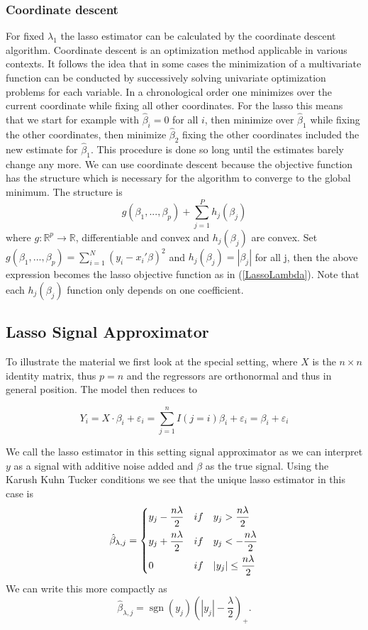 \documentclass{article}
\theoremstyle{definition}
\DeclareMathOperator*{\sgn}{sgn}
\begin{document}
\subsubsection{Coordinate descent} \label{Sec: Coordinate Lasso}
For fixed $\lambda_1$ the lasso estimator can be calculated by the coordinate descent algorithm.
Coordinate descent is an optimization method applicable in various contexts. It follows the idea that in some cases the minimization of a multivariate function can be conducted by successively solving univariate optimization problems for each variable. In a chronological order one minimizes over the current coordinate while fixing all other coordinates. For the lasso this means that we start for example with $\hat{\beta}_i =0$ for all $i$, then minimize over $\hat{\beta}_1$ while fixing the other coordinates, then minimize $\hat{\beta}_2$ fixing the other coordinates included the new estimate for $\hat{\beta}_1$. This procedure is done so long until the estimates barely change any more.
We can use coordinate descent because the objective function has the structure which is necessary for the algorithm to converge to the global minimum. The structure is
\begin{equation}
g(\beta_1,...,\beta_p)+\sum_{j=1}^Ph_j(\beta_j) \nonumber
\end{equation}
where $g: \mathbb{R}^p \to \mathbb{R}$, differentiable and convex and $h_j(\beta_j)$ are convex. Set $g(\beta_1,...,\beta_p)=\sum_{i=1}^{N}(y_{i}-x_{i}'\beta)^2$ and $h_j(\beta_j)=|\beta_j|$ for all j, then the above expression becomes the lasso objective function as in (\ref{LassoLambda}). Note that each $h_j(\beta_j)$ function only depends on one coefficient.
\cite[chapter 5]{sparsity}

\subsection{Lasso Signal Approximator}

To illustrate the material we first look at the special setting, where $X$ is the $n \times n$ identity matrix, thus $p=n$ and the regressors are orthonormal and thus in general position. The model then reduces to

$$Y_i=X \cdot\beta_i+\varepsilon_i=\sum^n_{j=1}I(j=i)\beta_i+\varepsilon_i = \beta_i + \varepsilon_i$$

We call the lasso estimator in this setting signal approximator as we can interpret $y$ as a signal with additive noise added and $\beta$ as the true signal.
Using the Karush Kuhn Tucker conditions we see that the unique lasso estimator in this case is
$$\hat\beta_{\lambda,j}= \begin{dcases} y_j-\frac{n\lambda}{2} &if \quad y_j>\frac{n\lambda}{2}\\
            									  y_j+\frac{n\lambda}{2} &if \quad y_j<-\frac{n\lambda}{2}\\
                                                  0						 &if \quad |y_j|\leq \frac{n\lambda}{2}
\end{dcases}$$
We can write this more compactly as 
\begin{equation}
 \hat\beta_{\lambda,j} = \sgn(y_j)(|y_j|-\frac{\lambda}{2})_+.
\end{equation}
\end{document}

